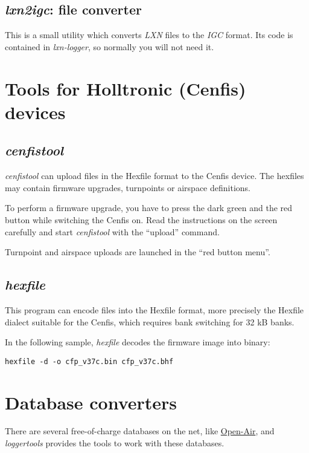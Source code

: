 \documentclass{article}
\begin{document}
\subsection{{\em lxn2igc}: file converter}

This is a small utility which converts {\em LXN} files to the {\em
IGC} format.  Its code is contained in {\em lxn-logger}, so normally
you will not need it.


\section{Tools for Holltronic (Cenfis) devices}

\subsection{{\em cenfistool}}

{\em cenfistool} can upload files in the Hexfile format to the Cenfis
device.  The hexfiles may contain firmware upgrades, turnpoints or
airspace definitions.

To perform a firmware upgrade, you have to press the dark green and
the red button while switching the Cenfis on.  Read the instructions
on the screen carefully and start {\em cenfistool} with the ``upload''
command.

Turnpoint and airspace uploads are launched in the ``red button
menu''.

\subsection{{\em hexfile}}

This program can encode files into the Hexfile format, more precisely
the Hexfile dialect suitable for the Cenfis, which requires bank
switching for 32 kB banks.

In the following sample, {\em hexfile} decodes the firmware image into
binary:

\begin{verbatim}
hexfile -d -o cfp_v37c.bin cfp_v37c.bhf
\end{verbatim}


\section{Database converters}

There are several free-of-charge databases on the net, like
\href{http://www.segelflug.de/segelflieger/michael.meier/}{Open-Air},
and {\em loggertools} provides the tools to work with these databases.
\end{document}
